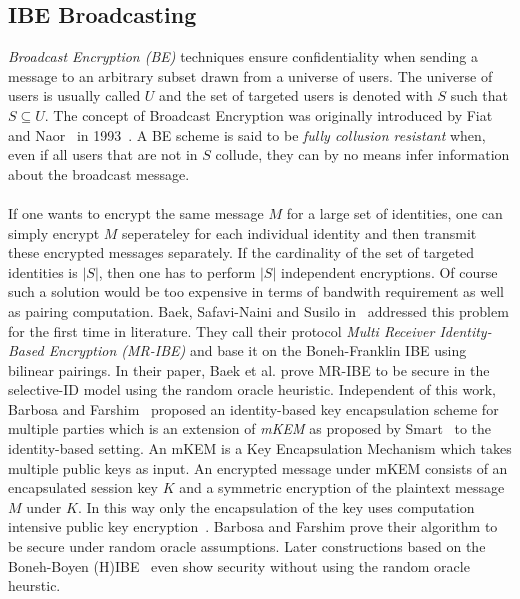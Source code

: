 \documentclass[journal]{IEEEtran}
\begin{document}
\subsection{IBE Broadcasting}
\textit{Broadcast Encryption (BE)} techniques ensure confidentiality when
sending a message to an arbitrary subset drawn from a universe of users. The
universe of users is usually called $U$ and the set of targeted users is
denoted with $S$ such that $S \subseteq U$. The concept of Broadcast Encryption
was originally introduced by Fiat and Naor~\cite{FiatBE} in
1993~\cite{LibertANOBE}. A BE scheme is said to be \textit{fully collusion
resistant} when, even if all users that are not in $S$ collude, they can by no
means infer information about the broadcast message.~\cite{DelerableeIBBE} \\
\\
If one wants to encrypt the same message $M$ for a large set of identities, one
can simply encrypt $M$ seperateley for each individual identity and then
transmit these encrypted messages separately. If the cardinality of the set of
targeted identities is $|S|$, then one has to perform $|S|$ independent
encryptions. Of course such a solution would be too expensive in terms of
bandwith requirement as well as pairing computation. Baek, Safavi-Naini and
Susilo in~\cite{BaekIBEandBE} addressed this problem for the first time in
literature. They call their protocol \textit{Multi Receiver Identity-Based
Encryption (MR-IBE)} and base it on the Boneh-Franklin IBE using bilinear
pairings. In their paper, Baek et al. prove MR-IBE to be secure in the
selective-ID model using the random oracle heuristic. Independent of this work,
Barbosa and Farshim~\cite{BarbosaIBEKEM} proposed an identity-based key
encapsulation scheme for multiple parties which is an extension of \textit{mKEM}
as proposed by Smart~\cite{SmartMKEM} to the identity-based
setting. An mKEM is a Key Encapsulation Mechanism which takes multiple public
keys as input. An encrypted message under mKEM consists of an encapsulated
session key $K$ and a symmetric encryption of the plaintext message $M$ under
$K$. In this way only the encapsulation of the key uses computation intensive
public key encryption~\cite{SmartMKEM}. Barbosa and Farshim prove their
algorithm to be secure under random oracle assumptions. Later
constructions based on the Boneh-Boyen (H)IBE~\cite{ChatterjeeHIBE} even show
security without using the random oracle heurstic.
~\cite{ChatterjeeShortenedCiphertext}\\
\\
\end{document}
